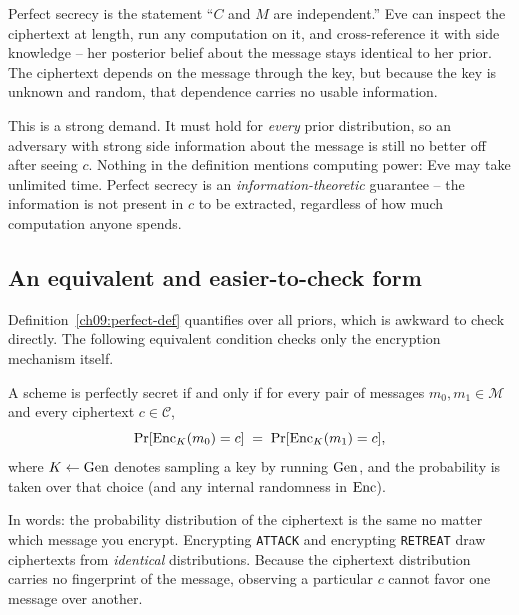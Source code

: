 \begin{intuitionbox}
Perfect secrecy is the statement ``$C$ and $M$ are independent.'' Eve can inspect the ciphertext at length, run any computation on it, and cross-reference it with side knowledge -- her posterior belief about the message stays identical to her prior. The ciphertext depends on the message through the key, but because the key is unknown and random, that dependence carries no usable information.
\end{intuitionbox}

This is a strong demand. It must hold for \emph{every} prior distribution, so an adversary with strong side information about the message is still no better off after seeing $c$. Nothing in the definition mentions computing power: Eve may take unlimited time. Perfect secrecy is an \emph{information-theoretic} guarantee -- the information is not present in $c$ to be extracted, regardless of how much computation anyone spends.

\subsection{An equivalent and easier-to-check form}
\label{ch09:equiv}

Definition~\ref{ch09:perfect-def} quantifies over all priors, which is awkward to check directly. The following equivalent condition checks only the encryption mechanism itself.

\begin{lemma}
\label{ch09:equiv-lemma}
A scheme is perfectly secret if and only if for every pair of messages $m_0, m_1 \in \mathcal{M}$ and every ciphertext $c \in \mathcal{C}$,
\[
  \Pr[\operatorname{Enc}_K(m_0) = c] \;=\; \Pr[\operatorname{Enc}_K(m_1) = c],
\]
where $K \gets \operatorname{Gen}$ denotes sampling a key by running $\operatorname{Gen}$, and the probability is taken over that choice (and any internal randomness in $\operatorname{Enc}$).
\end{lemma}

In words: the probability distribution of the ciphertext is the same no matter which message you encrypt. Encrypting \texttt{ATTACK} and encrypting \texttt{RETREAT} draw ciphertexts from \emph{identical} distributions. Because the ciphertext distribution carries no fingerprint of the message, observing a particular $c$ cannot favor one message over another.

